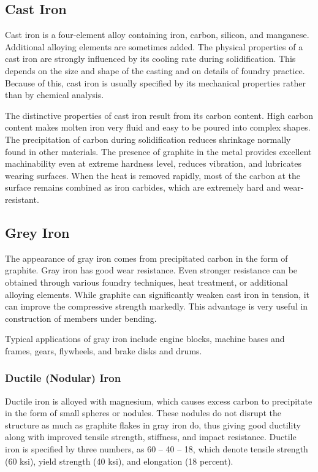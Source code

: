 \documentclass[a4paper,openany,nobib]{tufte-book}
\begin{document}
\subsection{Cast Iron}
\label{cast-iron}
Cast iron is a four-element alloy containing iron, carbon, silicon, and
manganese. Additional alloying elements are sometimes added. The
physical properties of a cast iron are strongly influenced by its
cooling rate during solidification. This depends on the size and shape
of the casting and on details of foundry practice. Because of this, cast
iron is usually specified by its mechanical properties rather than by
chemical analysis.

The distinctive properties of cast iron result from its carbon content.
High carbon content makes molten iron very fluid and easy to be poured
into complex shapes. The precipitation of carbon during solidification
reduces shrinkage normally found in other materials. The presence of
graphite in the metal provides excellent machinability even at extreme
hardness level, reduces vibration, and lubricates wearing surfaces. When
the heat is removed rapidly, most of the carbon at the surface remains
combined as iron carbides, which are extremely hard and wear-resistant.

\subsection{Grey Iron}
\label{grey-iron}
The appearance of gray iron comes from precipitated carbon in the form
of graphite. Gray iron has good wear resistance. Even stronger
resistance can be obtained through various foundry techniques, heat
treatment, or additional alloying elements. While graphite can
significantly weaken cast iron in tension, it can improve the
compressive strength markedly. This advantage is very useful in
construction of members under bending.

Typical applications of gray iron include engine blocks, machine bases
and frames, gears, flywheels, and brake disks and drums.

\subsubsection{Ductile (Nodular) Iron}
\label{ductile-nodular-iron}
Ductile iron is alloyed with magnesium, which causes excess carbon to
precipitate in the form of small spheres or nodules. These nodules do
not disrupt the structure as much as graphite flakes in gray iron do,
thus giving good ductility along with improved tensile strength,
stiffness, and impact resistance. Ductile iron is specified by three
numbers, as 60 -- 40 -- 18, which denote tensile strength (60 ksi),
yield strength (40 ksi), and elongation (18 percent).
\end{document}
